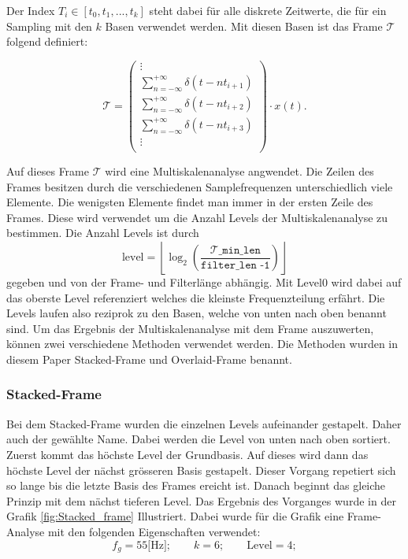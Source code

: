 Der Index $T_{i}\in[t_{0},t_{1},...,t_{k}]$ steht dabei für alle diskrete Zeitwerte, die für ein Sampling mit den $k$ Basen verwendet werden. Mit diesen Basen ist das Frame $\mathcal{T}$ folgend definiert:

\[
\mathcal{T}
=
\begin{pmatrix}
\vdots\\
\displaystyle\sum_{n=-\infty}^{+\infty} \delta(t - nt_{i+1})\\[1mm]
\displaystyle\sum_{n=-\infty}^{+\infty} \delta(t - nt_{i+2})\\[1mm]
\displaystyle\sum_{n=-\infty}^{+\infty} \delta(t - nt_{i+3})\\[1mm]
\vdots\\
\end{pmatrix}
\cdot x(t).
\]


Auf dieses Frame $\mathcal{T}$ wird eine Multiskalenanalyse angwendet. Die Zeilen des Frames besitzen durch die verschiedenen Samplefrequenzen unterschiedlich viele Elemente. Die wenigsten Elemente findet man immer in der ersten Zeile des Frames. Diese wird verwendet um die Anzahl Levels der Multiskalenanalyse zu bestimmen. Die Anzahl Levels ist durch
\[\text{level} = \left\lfloor\log_2\left(\mathtt{
	\frac{\mathcal{T}\_\text{min\_len}}{\text{filter\_len -1}}}\right)\right\rfloor
\]
gegeben und von der Frame- und Filterlänge abhängig.
Mit Level0 wird dabei auf das oberste Level referenziert welches die kleinste Frequenzteilung erfährt. Die Levels laufen also reziprok zu den Basen, welche von unten nach oben benannt sind. Um das Ergebnis der Multiskalenanalyse mit dem Frame auszuwerten, können zwei verschiedene Methoden verwendet werden. Die Methoden wurden in diesem Paper Stacked-Frame und Overlaid-Frame benannt. 

\newpage


\subsubsection{Stacked-Frame} 

Bei dem Stacked-Frame wurden die einzelnen Levels aufeinander gestapelt. Daher auch der gewählte Name. Dabei werden die Level von unten nach oben sortiert. Zuerst kommt das höchste Level der Grundbasis. Auf dieses wird dann das höchste Level der nächst grösseren Basis gestapelt. Dieser Vorgang repetiert sich so lange bis die letzte Basis des Frames ereicht ist. Danach beginnt das gleiche Prinzip mit dem nächst tieferen Level. Das Ergebnis des Vorganges wurde in der Grafik \ref{fig:Stacked_frame} Illustriert. Dabei wurde für die Grafik eine Frame-Analyse mit den folgenden Eigenschaften verwendet:
\[
f_{g}=55\text{[Hz]}; \qquad
k = 6 ; \qquad
\text{Level}= 4;
\] 



